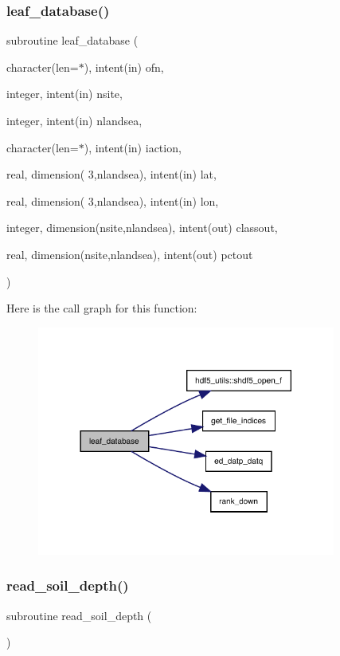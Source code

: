 \subsubsection{\texorpdfstring{leaf\+\_\+database()}{leaf\_database()}}
{\footnotesize\ttfamily subroutine leaf\+\_\+database (\begin{DoxyParamCaption}\item[{character(len=$\ast$), intent(in)}]{ofn,  }\item[{integer, intent(in)}]{nsite,  }\item[{integer, intent(in)}]{nlandsea,  }\item[{character(len=$\ast$), intent(in)}]{iaction,  }\item[{real, dimension(    3,nlandsea), intent(in)}]{lat,  }\item[{real, dimension(    3,nlandsea), intent(in)}]{lon,  }\item[{integer, dimension(nsite,nlandsea), intent(out)}]{classout,  }\item[{real, dimension(nsite,nlandsea), intent(out)}]{pctout }\end{DoxyParamCaption})}

Here is the call graph for this function\+:
\nopagebreak
\begin{figure}[H]
\begin{center}
\leavevmode
\includegraphics[width=278pt]{leaf__database_8f90_a5009d489b8b1c0d281ea517731499fb9_cgraph}
\end{center}
\end{figure}
\mbox{\label{leaf__database_8f90_aad22620a117c4d316d32f8cb3a185496}} 
\subsubsection{\texorpdfstring{read\+\_\+soil\+\_\+depth()}{read\_soil\_depth()}}
{\footnotesize\ttfamily subroutine read\+\_\+soil\+\_\+depth (\begin{DoxyParamCaption}{ }\end{DoxyParamCaption})}

